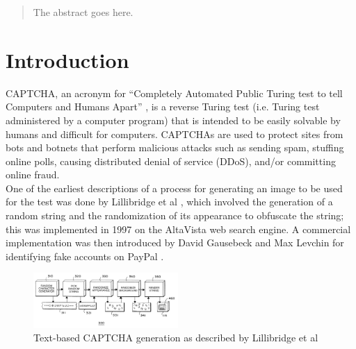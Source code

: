 \documentclass[conference,compsoc]{IEEEtran}
\begin{document}
\maketitle

\begin{abstract}
The abstract goes here.
\end{abstract}





%
\IEEEpeerreviewmaketitle



\section{Introduction}
CAPTCHA, an acronym for “Completely Automated Public Turing test to tell Computers and Humans Apart” \cite{vonahn04}, is a reverse Turing test (i.e. Turing test administered by a computer program) that is intended to be easily solvable by humans and difficult for computers. CAPTCHAs are used to protect sites from bots and botnets that perform malicious attacks such as sending spam, stuffing online polls, causing distributed denial of service (DDoS), and/or committing online fraud.\\

\indent One of the earliest descriptions of a process for generating an image to be used for the test was done by Lillibridge et al \cite{lillibridge01}, which involved the generation of a random string and the randomization of its appearance to obfuscate the string; this was implemented in 1997 on the AltaVista web search engine. A commercial implementation was then introduced by David Gausebeck and Max Levchin for identifying fake accounts on PayPal \cite{paypal02}.\\
\begin{figure}[h]
	\includegraphics[width=0.49\textwidth]{img01.png}
	\caption{Text-based CAPTCHA generation as described by Lillibridge et al}
	\label{fig:img01}
\end{figure}
\end{document}

